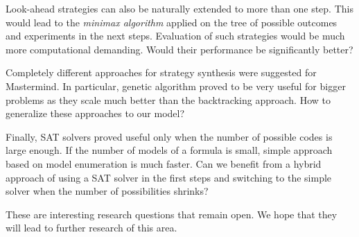 Look-ahead strategies can also be naturally extended to more than one step.
This would lead to the \emph{minimax algorithm} applied on the tree of
  possible outcomes and experiments in the next steps.
Evaluation of such strategies would be much more computational demanding.
Would their performance be significantly better?

Completely different approaches for strategy synthesis
  were suggested for Mastermind.
In particular, genetic algorithm
  proved to be very useful for bigger problems
  as they scale much better than the backtracking approach.
How to generalize these approaches to our model?

Finally, SAT solvers proved useful only when the number
  of possible codes is large enough.
If the number of models of a formula is small, simple approach based
  on model enumeration is much faster.
Can we benefit from a hybrid approach of
  using a SAT solver in the first steps and
  switching to the simple solver when the number of possibilities shrinks?

These are interesting research questions that remain open.
We hope that they will lead to further research of this area.
